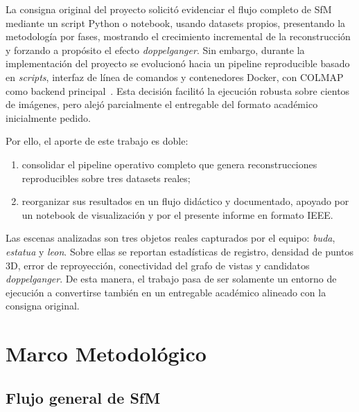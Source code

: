\documentclass[conference]{IEEEtran}
\begin{document}
La consigna original del proyecto solicit\'o evidenciar el flujo completo de SfM mediante un script Python o notebook, usando datasets propios, presentando la metodolog\'ia por fases, mostrando el crecimiento incremental de la reconstrucci\'on y forzando a prop\'osito el efecto \emph{doppelganger}. Sin embargo, durante la implementaci\'on del proyecto se evolucion\'o hacia un pipeline reproducible basado en \emph{scripts}, interfaz de l\'inea de comandos y contenedores Docker, con COLMAP como backend principal~\cite{b2,b3}. Esta decisi\'on facilit\'o la ejecuci\'on robusta sobre cientos de im\'agenes, pero alej\'o parcialmente el entregable del formato acad\'emico inicialmente pedido.

Por ello, el aporte de este trabajo es doble:
\begin{enumerate}
  \item consolidar el pipeline operativo completo que genera reconstrucciones reproducibles sobre tres datasets reales;
  \item reorganizar sus resultados en un flujo did\'actico y documentado, apoyado por un notebook de visualizaci\'on y por el presente informe en formato IEEE.
\end{enumerate}

Las escenas analizadas son tres objetos reales capturados por el equipo: \emph{buda}, \emph{estatua} y \emph{leon}. Sobre ellas se reportan estad\'isticas de registro, densidad de puntos 3D, error de reproyecci\'on, conectividad del grafo de vistas y candidatos \emph{doppelganger}. De esta manera, el trabajo pasa de ser solamente un entorno de ejecuci\'on a convertirse tambi\'en en un entregable acad\'emico alineado con la consigna original.

\section{Marco Metodol\'ogico}\label{sec:math}

\subsection{Flujo general de SfM}
\end{document}
